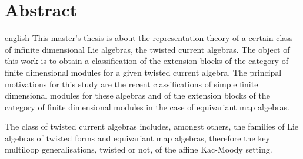 \chapter*{Abstract}                      %

\begin{otherlanguage*}{english}
This master's thesis is about the representation theory of a certain class of infinite dimensional Lie algebras, the twisted current algebras. The object of this work is to obtain a classification of the extension blocks of the category of finite dimensional modules for a given twisted current algebra. The principal motivations for this study are the recent classifications of simple finite dimensional modules for these algebras and of the extension blocks of the category of finite dimensional modules in the case of equivariant map algebras. 

The class of twisted current algebras includes, amongst others, the families of Lie algebras of twisted forms and equivariant map algebras, therefore the key multiloop generalisations, twisted or not, of the affine Kac-Moody setting.
\end{otherlanguage*}
